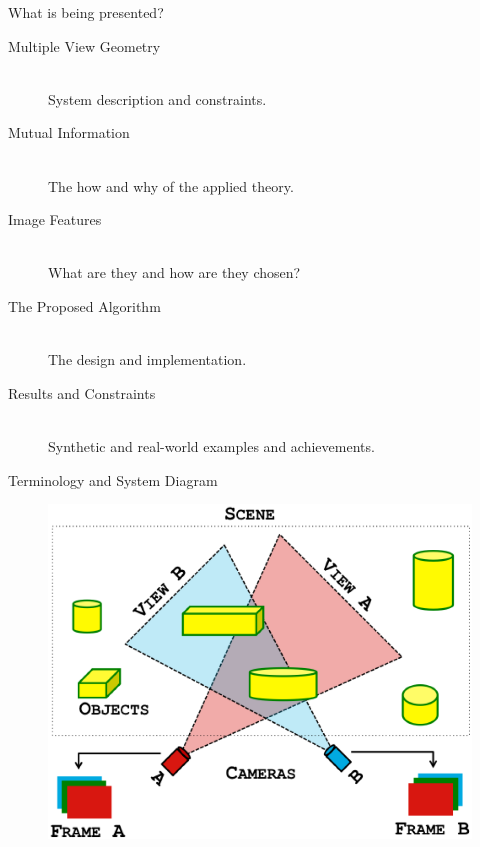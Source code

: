 \documentclass[serif]{beamer}
\begin{document}
\begin{frame}[t]{\sc What is being presented?}

\vfill

\begin{description}
\item[Multiple View Geometry] \hspace*{\fill} \\
System description and constraints.

\item[Mutual Information] \hspace*{\fill} \\
The how and why of the applied theory.

\item[Image Features] \hspace*{\fill} \\
What are they and how are they chosen?

\item[The Proposed Algorithm] \hspace*{\fill} \\
The design and implementation.

\item[Results and Constraints] \hspace*{\fill} \\
Synthetic and real-world examples and achievements.
\end{description}

\end{frame}




\begin{frame}[c]{\sc Terminology and System Diagram}

\begin{figure}
\centering
\includegraphics[width=.9\columnwidth]{Terminology}
\label{terminology}
\end{figure}

\end{frame}
\end{document}
